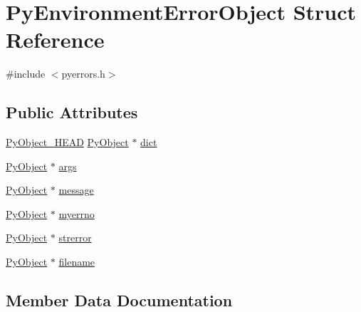 \hypertarget{struct_py_environment_error_object}{}\section{Py\+Environment\+Error\+Object Struct Reference}
\label{struct_py_environment_error_object}


{\ttfamily \#include $<$pyerrors.\+h$>$}

\subsection*{Public Attributes}
\begin{DoxyCompactItemize}
\item 
\mbox{\hyperlink{_python27_2object_8h_a0bf35c1f3ea13f925de94d8593db3b7e}{Py\+Object\+\_\+\+H\+E\+AD}} \mbox{\hyperlink{_python27_2object_8h_aadc84ac7aed2cfa6f20c25f62bf3dac7}{Py\+Object}} $\ast$ \mbox{\hyperlink{struct_py_environment_error_object_a9b6363c4c36c3fe124dd1173d6bea6dd}{dict}}
\item 
\mbox{\hyperlink{_python27_2object_8h_aadc84ac7aed2cfa6f20c25f62bf3dac7}{Py\+Object}} $\ast$ \mbox{\hyperlink{struct_py_environment_error_object_a7f90154e52e564e80cb468fd683455ad}{args}}
\item 
\mbox{\hyperlink{_python27_2object_8h_aadc84ac7aed2cfa6f20c25f62bf3dac7}{Py\+Object}} $\ast$ \mbox{\hyperlink{struct_py_environment_error_object_a0ca308cc7d2f5d01c612e9bf60860279}{message}}
\item 
\mbox{\hyperlink{_python27_2object_8h_aadc84ac7aed2cfa6f20c25f62bf3dac7}{Py\+Object}} $\ast$ \mbox{\hyperlink{struct_py_environment_error_object_a6a6b5fde89a772bdee37a9115e64bd51}{myerrno}}
\item 
\mbox{\hyperlink{_python27_2object_8h_aadc84ac7aed2cfa6f20c25f62bf3dac7}{Py\+Object}} $\ast$ \mbox{\hyperlink{struct_py_environment_error_object_a9df2fa55af8191a1052cc425466ffb0c}{strerror}}
\item 
\mbox{\hyperlink{_python27_2object_8h_aadc84ac7aed2cfa6f20c25f62bf3dac7}{Py\+Object}} $\ast$ \mbox{\hyperlink{struct_py_environment_error_object_ae996e0c9909b5c16d077ea57d93182a0}{filename}}
\end{DoxyCompactItemize}


\subsection{Member Data Documentation}
\mbox{\label{struct_py_environment_error_object_a7f90154e52e564e80cb468fd683455ad}} 
